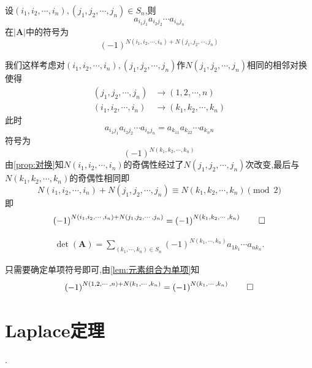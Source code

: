 \begin{green}
\begin{lemma}[元素组合为单项]\label{lem:元素组合为单项}
    设$\left(i_1,i_2,\cdots,i_n\right),\left(j_1,j_2,\cdots,j_n\right)\in S_n$,则
    \[
    a_{i_1j_1}a_{i_2j_2}\cdots a_{i_nj_n} 
    \]在$\left|\bm{A}\right|$中的符号为
    \[
    \left(-1\right)^{N\left(i_1,i_2,\cdots,i_n\right)+N\left(j_1,j_2,\cdots,j_n\right)}
    \]
\end{lemma}
\begin{Proof}
我们这样考虑对$\left(i_1,i_2,\cdots,i_n\right),\left(j_1,j_2,\cdots,j_n\right)$作$N\left(j_1,j_2,\cdots,j_n\right)$相同的相邻对换使得
\begin{align*}
    \left(j_1,j_2,\cdots,j_n\right)&\longrightarrow \left(1,2,\cdots,n\right)\\
    \left(i_1,i_2,\cdots,i_n\right)&\longrightarrow \left(k_1,k_2,\cdots,k_n\right)
\end{align*}此时
\[
a_{i_1j_1}a_{i_2j_2}\cdots a_{i_nj_n} = a_{k_11}a_{k_22}\cdots a_{k_nn}
\]符号为\[
\left(-1\right)^{N\left(k_1,k_2,\cdots,k_n\right)}
\]由\cref{prop:对换}知$N\left(i_1,i_2,\cdots,i_n\right)$的奇偶性经过了$N\left(j_1,j_2,\cdots,j_n\right)$次改变,最后与$N\left(k_1,k_2,\cdots,k_n\right)$的奇偶性相同即
\[
N\left(
    i_1,i_2,\cdots,i_n  
\right)+N\left(
    j_1,j_2,\cdots,j_n
\right) \equiv N\left(
    k_1,k_2,\cdots,k_n
\right) \pmod{2}
\]即\[
\left(-1\right)^{N\left(i_1,i_2,\cdots,i_n\right)+N\left(j_1,j_2,\cdots,j_n\right)}
=\left(-1\right)^{N\left(k_1,k_2,\cdots,k_n\right)}\qedhere
\]
\end{Proof}
\end{green}
\begin{formal}
\begin{theorem}[行向量表示的组合定义]\label{thm:行向量表示的组合定义}
\begin{align*}
     \det\left(\bm{A}\right) = \sum_{\left(
        k_1,\cdots,k_n
    \right) \in S_n}\left(-1\right)^{N\left(
        k_1,\cdots,k_n
    \right)} a_{1k_{1}} \cdots a_{nk_{n}}.
\end{align*}
\end{theorem}
\begin{Proof}
只需要确定单项符号即可,由\cref{lem:元素组合为单项}知\[
\left(-1\right)^{N\left(1,2,\cdots,n\right)+N\left(k_1,\cdots,k_n\right)}=\left(-1\right)^{N\left(k_1,\cdots,k_n\right)}\qedhere
\]
\end{Proof}
\end{formal}
\newpage
\section{Laplace定理}.

